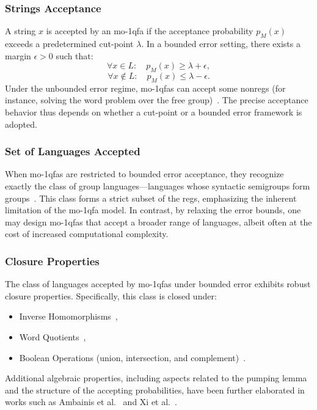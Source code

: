 \subsubsection{Strings Acceptance}
A string $x$ is accepted by an \gls{mo-1qfa} if the acceptance probability $p_M(x)$ exceeds a predetermined cut-point $\lambda$. In a bounded error setting, there exists a margin $\epsilon > 0$ such that:
\[
\forall x\in L:\quad p_M(x) \ge \lambda + \epsilon,
\]
\[
\forall x\notin L:\quad p_M(x) \le \lambda - \epsilon.
\]
Under the unbounded error regime, \glspl{mo-1qfa} can accept some non\glspl{reg} (for instance, solving the word problem over the free group)~\cite{brodsky2002characterizations}. The precise acceptance behavior thus depends on whether a cut-point or a bounded error framework is adopted.

\subsubsection{Set of Languages Accepted}
When \glspl{mo-1qfa} are restricted to bounded error acceptance, they recognize exactly the class of group languages—languages whose syntactic semigroups form groups~\cite{brodsky2002characterizations}. This class forms a strict subset of the \glspl{reg}, emphasizing the inherent limitation of the \gls{mo-1qfa} model. In contrast, by relaxing the error bounds, one may design \glspl{mo-1qfa} that accept a broader range of languages, albeit often at the cost of increased computational complexity.

\subsubsection{Closure Properties}
The class of languages accepted by \glspl{mo-1qfa} under bounded error exhibits robust closure properties. Specifically, this class is closed under:
\begin{itemize}
    \item Inverse Homomorphisms~\cite{brodsky2002characterizations},
    \item Word Quotients~\cite{brodsky2002characterizations},
    \item Boolean Operations (union, intersection, and complement)~\cite{freivalds2005languages,bertoni2003quantum}.
\end{itemize}
Additional algebraic properties, including aspects related to the pumping lemma and the structure of the accepting probabilities, have been further elaborated in works such as Ambainis et al.~\cite{ambainis1999probabilities} and Xi et al.~\cite{xi2008some}.


